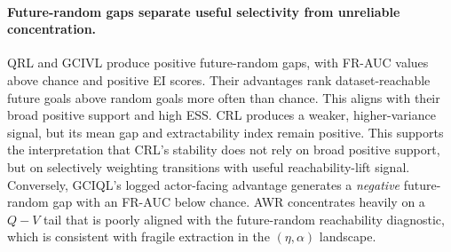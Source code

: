 \paragraph{Future-random gaps separate useful selectivity from unreliable concentration.}
QRL and GCIVL produce positive future-random gaps, with FR-AUC values above chance and positive EI scores.
Their advantages rank dataset-reachable future goals above random goals more often than chance.
This aligns with their broad positive support and high ESS.
CRL produces a weaker, higher-variance signal, but its mean gap and extractability index remain positive.
This supports the interpretation that CRL's stability does not rely on broad positive support, but on selectively weighting transitions with useful reachability-lift signal.
Conversely, GCIQL's logged actor-facing advantage generates a \emph{negative} future-random gap with an FR-AUC below chance.
AWR concentrates heavily on a \(Q-V\) tail that is poorly aligned with the future-random reachability diagnostic, which is consistent with fragile extraction in the \((\eta,\alpha)\) landscape.

%



